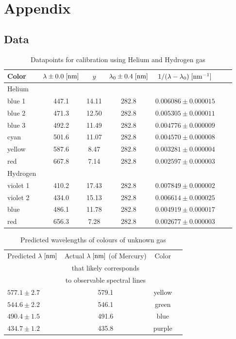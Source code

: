 \documentclass[12pt]{article}
\begin{document}
\newpage
\printbibliography


\section*{Appendix}
\subsection*{Data}
\begin{table}[h!]
\centering %
\caption{Datapoints for calibration using Helium and Hydrogen gas} 
\label{table:calibration} %
\begin{tabular}{lcccccc}
\hline
Color & $\lambda\pm0.0\;{\rm [nm]}$ & $y$ & $\lambda_0 \pm 0.4\;{\rm [nm]}$  & $1/ (\lambda-\lambda_0)\;{\rm [nm^{-1}]}$ \\
\hline
Helium\\
\hline
blue 1& 447.1  & 14.11 &  282.8  & $0.006086 \pm 0.000015$\\
blue 2& 471.3  & 12.50 &  282.8  &  $0.005305 \pm 0.000011$\\
blue 3& 492.2  & 11.49 &  282.8  & $0.004776 \pm 0.000009$\\
cyan & 501.6  & 11.07 &  282.8  & $0.004570 \pm 0.000008$\\
yellow & 587.6  & 8.47  &  282.8  & $0.003281 \pm 0.000004$\\
red  & 667.8  & 7.14  &  282.8  & $0.002597 \pm 0.000003$\\
\hline
Hydrogen\\
\hline
violet 1& 410.2 & 17.43 &  282.8  & $0.007849 \pm 0.000002$\\
violet 2& 434.0 & 15.13 &  282.8  & $0.006614 \pm 0.000025$\\
blue  & 486.1  & 11.78 &  282.8  & $0.004919 \pm 0.000017$\\
red  & 656.3  & 7.28  &  282.8  & $0.002677 \pm 0.000003$\\
\hline
\end{tabular}
\end{table}

\begin{table}
\centering %
\caption{Predicted wavelengths of colours of unknown gas} 
\label{table:predicted_wavelengths} %
\begin{tabular}{lccc}
\hline
Predicted $\lambda\;\rm [nm]$& Actual $\lambda\;\rm [nm]$ (of Mercury)& Color\\
&that likely corresponds&\\
&to observable spectral lines&\\
\hline
$577.1 \pm 2.7$& 579.1 &yellow\\
$544.6 \pm 2.2$& 546.1 &green\\
$490.4 \pm 1.5$& 491.6 &blue\\
$434.7 \pm 1.2$& 435.8 &purple \\
\hline
\end{tabular}
\end{table}
\newpage
\end{document}
